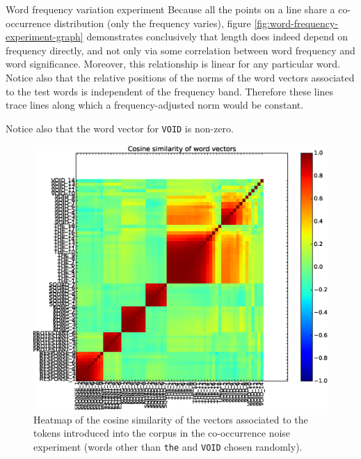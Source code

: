 \documentclass{article} %
\newcommand{\word}[1]{\texttt{#1}}
\begin{document}
\begin{section}{Word frequency variation experiment}
Because all the points on a line share a co-occurrence distribution (only the frequency varies), figure \ref{fig:word-frequency-experiment-graph} demonstrates conclusively that length does indeed depend on frequency directly, and not only via some correlation between word frequency and word significance.
Moreover, this relationship is linear for any particular word.
Notice also that the relative positions of the norms of the word vectors associated to the test words is independent of the frequency band.
Therefore these lines trace lines along which a frequency-adjusted norm would be constant.

Notice also that the word vector for \word{VOID} is non-zero.


\begin{figure}\label{word-frequency-experiment-heatmap}
	\includegraphics[scale=0.5]{word-frequency-experiment-heatmap}
	\caption{
	Heatmap of the cosine similarity of the vectors associated to the
	tokens introduced into the corpus in the co-occurrence noise experiment
	(words other than \word{the} and \word{VOID} chosen randomly).
	}
\end{figure}

\begin{table}\label{word-frequency-experiment-cosine-similarity}
	
	\caption{
		The most similar words in the original vocabulary to the tokens
		introduced into the corpus associated to the word \word{the},
		and their cosine similarity with the most frequent such token,
		\word{THE\_1}.  It is apparent from the nearest neigbours that
		the word vectors of the low frequency tokens have not been
		adequately trained (there were inadequate samples).
	}
\end{table}


\end{section}
\end{document}
